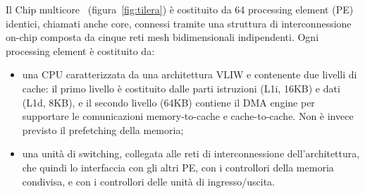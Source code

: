 Il Chip multicore \tile\ (figura~\ref{fig:tilera}) \`e costituito da 64 processing element (PE) identici, chiamati anche core, connessi tramite una struttura di interconnessione on-chip composta da cinque reti mesh bidimensionali indipendenti. Ogni processing element \`e costituito da:
\begin{itemize}
\item una CPU caratterizzata da una architettura VLIW e contenente due livelli di cache: il primo livello \`e costituito dalle parti istruzioni (L1i, 16KB) e dati (L1d, 8KB), e il secondo livello (64KB) contiene il DMA engine per supportare le comunicazioni memory-to-cache e cache-to-cache. Non \`e invece previsto il prefetching della memoria;
\item una unit\`a di switching, collegata alle reti di interconnessione dell'architettura, che quindi lo interfaccia con gli altri PE, con i controllori della memoria condivisa, e con i controllori delle unit\`a di ingresso/uscita.
\end{itemize}

